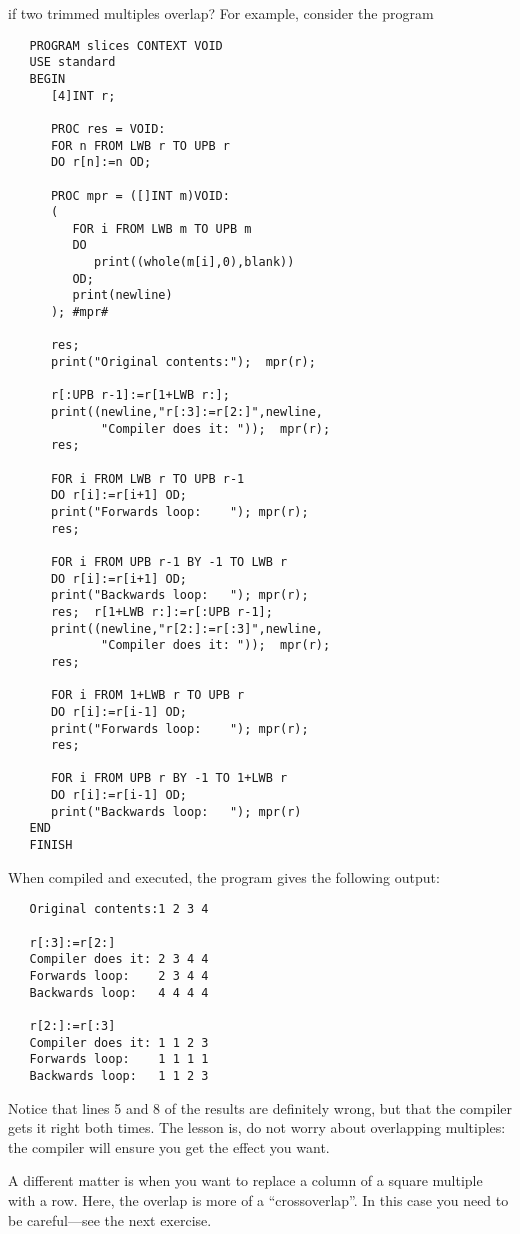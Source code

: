  if two
trimmed multiples overlap? For example, consider the program
\begin{verbatim}
   PROGRAM slices CONTEXT VOID
   USE standard
   BEGIN
      [4]INT r;

      PROC res = VOID:
      FOR n FROM LWB r TO UPB r
      DO r[n]:=n OD;

      PROC mpr = ([]INT m)VOID:
      (
         FOR i FROM LWB m TO UPB m
         DO
            print((whole(m[i],0),blank))
         OD;
         print(newline)
      ); #mpr#

      res;
      print("Original contents:");  mpr(r);

      r[:UPB r-1]:=r[1+LWB r:];
      print((newline,"r[:3]:=r[2:]",newline,
             "Compiler does it: "));  mpr(r);
      res;

      FOR i FROM LWB r TO UPB r-1
      DO r[i]:=r[i+1] OD;
      print("Forwards loop:    "); mpr(r);
      res;

      FOR i FROM UPB r-1 BY -1 TO LWB r
      DO r[i]:=r[i+1] OD;
      print("Backwards loop:   "); mpr(r);
      res;  r[1+LWB r:]:=r[:UPB r-1];
      print((newline,"r[2:]:=r[:3]",newline,
             "Compiler does it: "));  mpr(r);
      res;

      FOR i FROM 1+LWB r TO UPB r
      DO r[i]:=r[i-1] OD;
      print("Forwards loop:    "); mpr(r);
      res;

      FOR i FROM UPB r BY -1 TO 1+LWB r
      DO r[i]:=r[i-1] OD;
      print("Backwards loop:   "); mpr(r)
   END
   FINISH
\end{verbatim}
\noindent
When compiled and executed, the program gives the following output:
\begin{verbatim}
   Original contents:1 2 3 4 
   
   r[:3]:=r[2:]
   Compiler does it: 2 3 4 4 
   Forwards loop:    2 3 4 4 
   Backwards loop:   4 4 4 4 
   
   r[2:]:=r[:3]
   Compiler does it: 1 1 2 3 
   Forwards loop:    1 1 1 1 
   Backwards loop:   1 1 2 3 
\end{verbatim}
\noindent
Notice that lines 5 and 8 of the results are definitely wrong, but that
the compiler gets it right both times. The lesson is, do not worry
about overlapping multiples:  the compiler will ensure you get the
effect you want.

A different matter is when you want to replace a column of a square
multiple with a row. Here, the overlap is more of a ``crossoverlap''.
In this case you need to be careful---see the next exercise.
\newpage

